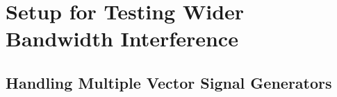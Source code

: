 \section{Setup for Testing Wider Bandwidth Interference}

\subsection{Handling Multiple Vector Signal Generators}


%
%
%
%
%
%
%
